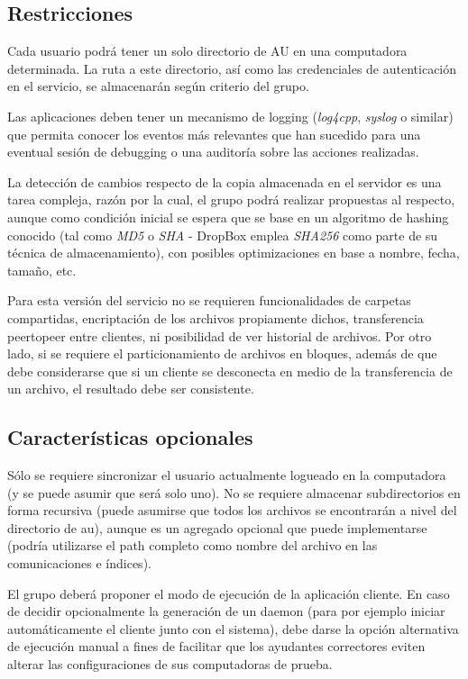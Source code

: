 \documentclass{article}
\begin{document}
\subsection{Restricciones}
\smallskip

	Cada usuario podrá tener un solo directorio de AU en una computadora determinada. La ruta a este directorio, así como las credenciales de autenticación en el servicio, se almacenarán según criterio del grupo.
	\par
	Las aplicaciones deben tener un mecanismo de logging (\textit{log4cpp}, \textit{syslog} o similar) que permita conocer los eventos más relevantes que han sucedido para una eventual sesión de debugging o una auditoría sobre las acciones realizadas.
	\par
	La detección de cambios respecto de la copia almacenada en el servidor es una tarea compleja, razón por la cual, el grupo podrá realizar propuestas al respecto, aunque como condición inicial se espera que se base en un algoritmo de hashing conocido (tal como \textit{MD5} o \textit{SHA} -  DropBox emplea \textit{SHA256} como parte de su técnica de almacenamiento), con posibles optimizaciones en base a nombre, fecha, tamaño, etc.
	\par
	Para esta versión del servicio no se requieren funcionalidades de carpetas compartidas, encriptación de los archivos propiamente dichos, transferencia peertopeer entre clientes, ni posibilidad de ver historial de archivos. Por otro lado, si se requiere el particionamiento de archivos en bloques, además de que debe considerarse que si un cliente se desconecta en medio de la transferencia de un archivo, el resultado debe ser consistente.
\bigskip



\subsection{Características opcionales}
\smallskip

	Sólo se requiere sincronizar el usuario actualmente logueado en la computadora (y se puede asumir que será solo uno). No se requiere almacenar subdirectorios en forma recursiva (puede asumirse que todos los archivos se encontrarán a nivel del directorio de au), aunque es un agregado opcional que puede implementarse (podría utilizarse el path completo como nombre del archivo en las comunicaciones e índices).
	\par
	El grupo deberá proponer el modo de ejecución de la aplicación cliente. En caso de decidir opcionalmente la generación de un daemon (para por ejemplo iniciar automáticamente el cliente junto con el sistema), debe darse la opción alternativa de ejecución manual a fines de facilitar que los ayudantes correctores eviten alterar las configuraciones de sus computadoras de prueba.
\bigskip\medskip
\end{document}

